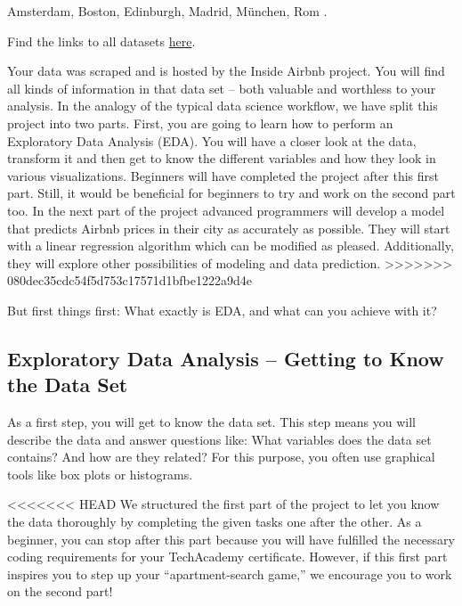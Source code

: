\documentclass[
  11pt,
]{article}
\begin{document}
Amsterdam,
Boston,
Edinburgh,
Madrid,
München,
Rom .

Find the links to all datasets \href{https://docs.google.com/document/d/1nBkeJmpnoiATVw4B3DwrB45uo0TpQFE_iTisyh4p9Ro/edit?usp=sharing}{here}.

Your data was scraped and is hosted by the Inside Airbnb project. You will find all kinds of information in that data set -- both valuable and worthless to your analysis.
In the analogy of the typical data science workflow, we have split this project into two parts. First, you are going to learn how to perform an Exploratory Data Analysis (EDA). You will have a closer look at the data, transform it and then get to know the different variables and how they look in various visualizations. Beginners will have completed the project after this first part. Still, it would be beneficial for beginners to try and work on the second part too. In the next part of the project advanced programmers will develop a model that predicts Airbnb prices in their city as accurately as possible. They will start with a linear regression algorithm which can be modified as pleased. Additionally, they will explore other possibilities of modeling and data prediction.
>>>>>>> 080dec35cdc54f5d753c17571d1bfbe1222a9d4e

But first things first: What exactly is EDA, and what can you achieve with it?

\hypertarget{exploratory-data-analysis-getting-to-know-the-data-set}{%
\subsection{Exploratory Data Analysis -- Getting to Know the Data Set}\label{exploratory-data-analysis-getting-to-know-the-data-set}}

As a first step, you will get to know the data set.
This step means you will describe the data and answer questions like: What variables does the data set contains?
And how are they related?
For this purpose, you often use graphical tools like box plots or histograms.

<<<<<<< HEAD
We structured the first part of the project to let you know the data thoroughly by completing the given tasks one after the other.
As a beginner, you can stop after this part because you will have fulfilled the necessary coding requirements for your TechAcademy certificate.
However, if this first part inspires you to step up your ``apartment-search game,'' we encourage you to work on the second part!
\end{document}
